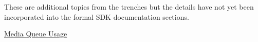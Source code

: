 These are additional topics from the trenches but the details have not yet been incorporated into the formal S\+DK documentation sections.


\begin{DoxyItemize}
\item \hyperlink{sdk_notes_media_queue_usage}{Media Queue Usage} 
\end{DoxyItemize}